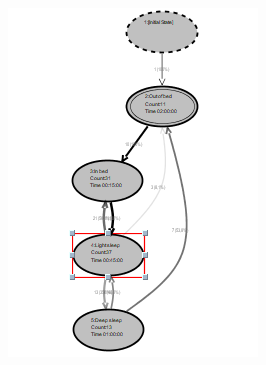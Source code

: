 \documentclass[12pt]{extarticle}
\begin{document}
\begin{figure}[H]
    \centering
    \begin{subfigure}[b]{0.45\textwidth}
        \includegraphics[width=\textwidth]{../Diagrams/sleeping_clicked.png}
        \caption{}
        \label{fig:sleep_clicked}
    \end{subfigure}
    ~ %
    \begin{subfigure}[b]{0.45\textwidth}

\end{subfigure}
\end{figure}
\end{document}
